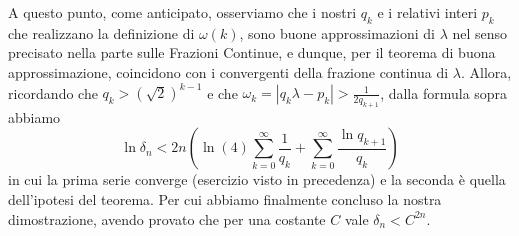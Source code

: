 A questo punto, come anticipato, osserviamo che i nostri $q_k$ e i relativi interi $p_k$ che realizzano la definizione di $\omega(k)$, sono buone approssimazioni di $\lambda$ nel senso precisato nella parte sulle Frazioni Continue, e dunque, per il teorema di buona approssimazione, coincidono con i convergenti della frazione continua di $\lambda$. Allora, ricordando che $q_k>(\sqrt{2})^{k-1}$ e che $\omega_k=|q_k\lambda-p_k|>\frac{1}{2q_{k+1}}$, dalla formula sopra abbiamo
\[\ln\delta_n <2n\left(\ln(4)\sum_{k=0}^\infty \frac{1}{q_k}+\sum_{k=0}^\infty \frac{\ln q_{k+1}}{q_k} \right)\]
in cui la prima serie converge (esercizio visto in precedenza) e la seconda è quella dell'ipotesi del teorema. Per cui abbiamo finalmente concluso la nostra dimostrazione, avendo provato che per una costante $C$ vale $\delta_n<C^{2n}$.